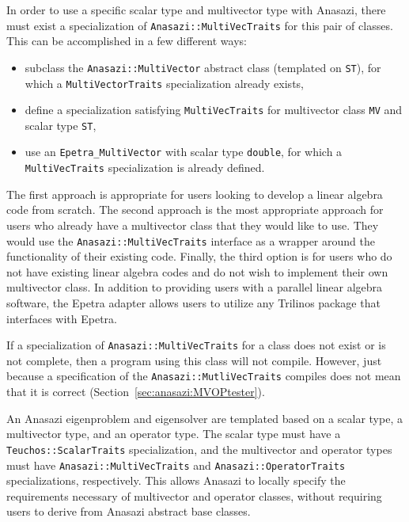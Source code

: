 In order to use a specific scalar type and multivector type with Anasazi, there
must exist a specialization of \verb!Anasazi::MultiVecTraits! for this pair of
classes. This can be accomplished in a few different ways:
\begin{itemize}
\item subclass the \verb!Anasazi::MultiVector! abstract class (templated on
\verb!ST!), for which a \verb!MultiVectorTraits! specialization already exists,
\item define a specialization satisfying \verb!MultiVecTraits! for multivector
class \verb!MV! and scalar type \verb!ST!,
\item use an \verb!Epetra_MultiVector! with scalar type \verb!double!, 
for which a \verb!MultiVecTraits! specialization is already defined.
\end{itemize}

The first approach is appropriate for users looking to develop a linear algebra
code from scratch.  The second approach is the most appropriate approach for
users who already have a multivector class that they would like to use. They
would use the \verb!Anasazi::MultiVecTraits!  interface as a wrapper around the
functionality of their existing code.  Finally, the third option is for users
who do not have existing linear algebra codes and do not wish to implement
their own multivector class. In addition to providing users with a parallel
linear algebra software, the Epetra adapter allows users to utilize any
Trilinos package that interfaces with Epetra.

If a specialization of \verb!Anasazi::MultiVecTraits! for a class does not
exist or is not complete, then a program using this class will not compile.
However, just because a specification of the \verb!Anasazi::MutliVecTraits!
compiles does not mean that it is correct
(Section~\ref{sec:anasazi:MVOPtester}).

\begin{remark} 
An Anasazi eigenproblem and eigensolver are templated based on a scalar type, a
multivector type, and an operator type. The scalar type must have a
\verb!Teuchos::ScalarTraits! specialization, and the multivector and operator
types must have \verb!Anasazi::MultiVecTraits! and
\verb!Anasazi::OperatorTraits! specializations, respectively. This allows
Anasazi to locally specify the requirements necessary of multivector and
operator classes, without requiring users to derive
from Anasazi abstract base classes.
\end{remark}



